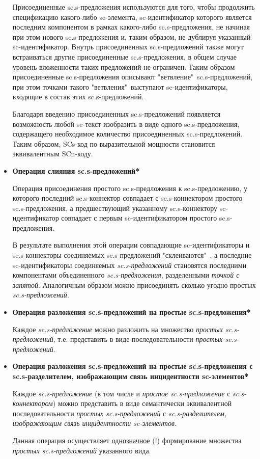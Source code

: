 \begin{itemize}
{		Присоединенные sc.s-предложения используются для того, чтобы продолжить спецификацию какого-либо sc-элемента, sc-идентификатор которого является последним компонентом в рамках какого-либо sc.s-предложения, не начиная при этом нового sc.s-предложения и, таким образом, не дублируя указанный \mbox{sc-идентификатор}. Внутрь присоединенных sc.s-предложений также могут встраиваться другие присоединенные sc.s-предложения, в общем случае уровень вложенности таких предложений не ограничен. Таким образом присоединенные sc.s-предложения описывают "ветвление"\ sc.s-предложений, при этом точками такого "ветвления"\ выступают sc-идентификаторы, входящие в состав этих sc.s-предложений.
		
		Благодаря введению присоединенных sc.s-предложений появляется возможность любой sc-текст изобразить в виде одного sc.s-предложения, содержащего необходимое количество присоединенных sc.s-предложений. Таким образом, SCs-код по выразительной мощности становится эквивалентным SCn-коду.}
	\item{\textbf{Операция слияния sc.s-предложений*}
		
		Операция присоединения простого sc.s-предложения к sc.s-предложению, у которого последний sc.s-коннектор совпадает с sc.s-коннектором простого sc.s-предложения, а предшествующий указанному sc.s-коннектору sc-идентификатор совпадает с первым sc-идентификатором простого sc.s-предложения.
		
		В результате выполнения этой операции совпадающие sc-идентификаторы и sc.s-коннекторы соединяемых sc.s-предложений "склеиваются"\ , а последние sc-иден\-ти\-фи\-ка\-то\-ры соединяемых \textit{sc.s-предложений} становятся последними компонентами объединенного \textit{sc.s-предложения},
		разделенными \textit{точкой с запятой}. Аналогичным образом можно присоединять сколько угодно простых \textit{sc.s-предложений}.}
	\item{\textbf{Операция разложения sc.s-предложений на простые sc.s-предложения*}
		
		Каждое \textit{sc.s-предложение} можно разложить на множество \textit{простых sc.s-предложений}, т.е. представить в виде последовательности \textit{простых sc.s-предложений}.}
	\item{\textbf{Операция разложения sc.s-предложений на простые sc.s-предложения с sc.s-разделителем, изображающим связь инцидентности sc-элементов*}
		
		Каждое \textit{sc.s-предложение} (в том числе и \textit{простое sc.s-предложение} с \textit{sc.s-коннектором}) можно представить в виде семантически эквивалентной последовательности \textit{простых \mbox{sc.s-предложений}} с \textit{sc.s-разделителем, изображающим связь инцидентности \mbox{sc-элементов}}.
		
		Данная операция осуществляет \uline{однозначное} (!) формирование множества \textit{простых \mbox{sc.s-предложений}} указанного вида.}
\end{itemize}

